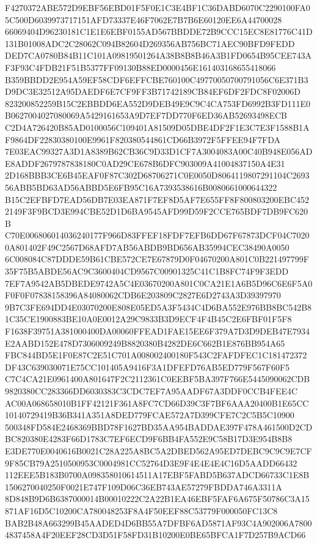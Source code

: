 \documentclass[UTF8,fontset=fandol,zihao=-4,a4paper]{ctexart}
\begin{document}
{{F4270372ABE572D9EBF56EBD01F5F0E1C3E4BF1C36DABD6070C2290100FA05C500D6039973717151AFD73337E46F7062E7B7B6E60120EE6A44700028
66069404D96230181C1E1E6EBF0155AD567BBDDE72B9CCC15EC8E81776C41D131B01008ADC2C28062C094B82604D269356AB756BC71AEC90BFD9FEDD
DED7CA0780B84B11C101A09819501264A38B8B8B46A3B1FD0654B95CEE743AF3F93C4FDB21F51B5377FF09130B88ED0000456E161403168655418066
B359BBDD2E954A59EF58CDF6EFFCBE760100C49770050700791056C6E371B3D9DC3E32512A95DAEDF6E7CF9FF3B71742189CB84EF6DF2FDC8F02006D
823200852259B15C2EBBDD6EA552D9DEB49E9C9C4CA753FD6992B3FD111E0B0627004027080069A5429161653A9D7EF7DD770F6ED36AB52693498ECB
C2D4A726420B85AD0100056C109401A81509D05DBE4DF2F1E3C7E3F1588B1AF9864DF22830380100E9961F820380544861CD66B3972F5FFEE94F7FDA
7E03EAC99327A3D1A8389B62CB36C9D33D1CF7A3004083A00C40B948E056ADE8ADDF2679787838180C0AD29CE678B6DFC903009A41004837150A4E31
2D168BBB3CE6B45EAF0F87C302D68706271C0E0050D8064119807291104C269356ABB5BD63AD56ABBD5E6FB95C16A7393538616B0080661000644322
B15C2EFBFD7EAD56DB7E03EA871F7EF8D5AF7E655FF8F800803200EBC4522149F3F9BCD3E994CBE52D1D6BA9545AFD99D59F2CCE765BDF7DB9FC620B
C70E006806014036240177F966D83FFEF18FDF7EFB6DD67F67873DCF04C70200A801402F49C2567D68AFD7AB56ABDB9BD656AB35994CEC38490A0050
6C008084C87DDDE59B61CBE572CE7E67879D0F04670200A801C0B221497799F35F75B5ABDE56AC9C3600404CD9567C00901325C41C1B8FC74F9F3EDD
7EF7A9542AB5DBEDE9742A5C4E03670200A801C0CA21E1A6B5D96C6E6F5A0F0F0F07838158396A84080062CDB6E203809C2827E6D2743A3D39397970
9B7C3FE694DD4E03070200E808E05ED5A3F5434C4D6BA552E976BB8BC542B81C35CE1900883BE10A0E0012A29C9833B3D9ECF4F4B45C2E6FBF01F5F8
F1638F39751A381000400DA00060FFEAD1FAE15EE6F379A7D3D9DEB47E7934E2AABD152E478D7306009249B8820380B4282DE6C662B1E876BB954A65
FBC844BD5E1F0E87C2E51C701A008002400180F543C2FAFDFEC1C181472372DF43C639030071E75CC101405A9416F3A1DFEFD76AB5ED779F567F60F5
C7C4CA21E0961400A801647F2C2112361C0EEBF5BA397F766E5445090062CDB9820380CC283366DD6030383C3CDC7EF7A95AADF67A3DDF0CCB4FEE4C
AC00A068658010B1FF42121F361A8FC7CD66D39C3F7BF6AAA20400B1E65CC10140729419B36B341A351A8DED779FCAE572A7D399CFE7C2C5B5C10900
500348FD584E2468369BBD78F1627BD35AA954BADDAE397F478A461500D2CDBC820380E4283F66D1783C7EF6ECD9F6BB4FA552E9C58B17D3E954B8B8
E3DE770E0040616B0021C28A225A8BC5A2DBED562A95ED7DEBC9C9C9E7CF9F85CB79A2510500953C0004981CC52764D3E9F4E4E4E4C16D5AADD66432
112EEE5B183B0700A098358010614511A17EBF5FABD5B637ADCD66733C1E8B1506270040250F0021E747F109D06C36EB743AE57279FBDDA746A3311A
8D848B9D6B6387000014B00010222C2A22B1EA46EBF5FAF6A675F50786C3A15871AF16D5C10200CA780048253F8A4F50EEF88C53779F000050FC13C8
BAB2B48A663299B45AADED4D6BB55A7DFBF6AD5871AF93C4A902006A78004837458A4F20EEF28CD3D51F58FD31B10200E0BE65BFCA1F7D257B9ACD66
}}
\end{document}

